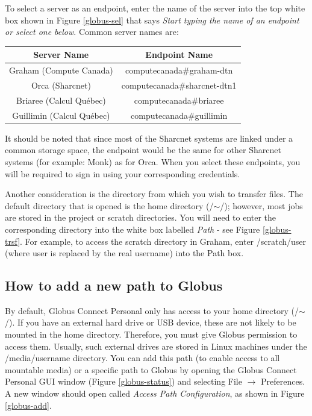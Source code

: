 \documentclass[12pt]{article}
\begin{document}
\quad To select a server as an endpoint, enter the name of the server into the top white box shown in Figure \ref{globus-sel} that says \textit{Start typing the name of an endpoint or select one below}. Common server names are:

\begin{table}[H]
\centering
{\renewcommand{\arraystretch}{1.2}%
\begin{tabular}{c|c}
Server Name & Endpoint Name \\
\hline
Graham (Compute Canada) & computecanada\#graham-dtn \\
Orca (Sharcnet) & computecanada\#sharcnet-dtn1 \\
Briaree (Calcul Qu\'{e}bec) & computecanada\#briaree \\
Guillimin (Calcul Qu\'{e}bec) & computecanada\#guillimin
\end{tabular}
}
\end{table}

It should be noted that since most of the Sharcnet systems are linked under a common storage space, the endpoint would be the same for other Sharcnet systems (for example: Monk) as for Orca. When you select these endpoints, you will be required to sign in using your corresponding credentials. 

\quad Another consideration is the directory from which you wish to transfer files. The default directory that is opened is the home directory (/$\sim$/); however, most jobs are stored in the project or scratch directories. You will need to enter the corresponding directory into the white box labelled \textit{Path} - see Figure \ref{globus-trsf}. For example, to access the scratch directory in Graham, enter /scratch/user (where user is replaced by the real username) into the Path box.

\subsection{How to add a new path to Globus}

\quad By default, Globus Connect Personal only has access to your home directory (/$\sim$/). If you have an external hard drive or USB device, these are not likely to be mounted in the home directory. Therefore, you must give Globus permission to access them. Usually, such external drives are stored in Linux machines under the /media/username directory. You can add this path (to enable access to all mountable media) or a specific path to Globus by opening the Globus Connect Personal GUI window (Figure \ref{globus-status}) and selecting File $\rightarrow$ Preferences. A new window should open called \textit{Access Path Configuration}, as shown in Figure \ref{globus-add}.
\end{document}
